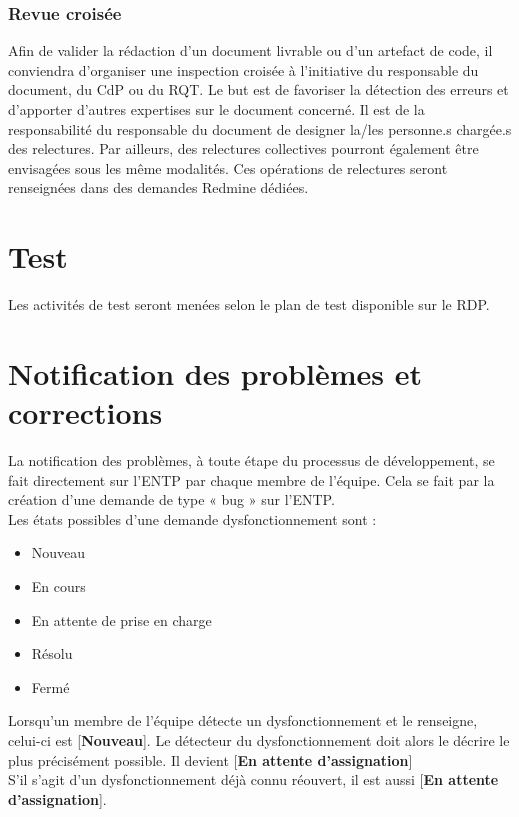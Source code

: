 \documentclass[a4paper,11pt,titlepage]{article}
\begin{document}
\subsubsection{Revue croisée} \label{sec:Rev}
Afin de valider la rédaction d'un document livrable ou d'un artefact de
code, il conviendra d'organiser une inspection croisée à l'initiative du
responsable du document, du CdP ou du RQT. Le but est de favoriser la
détection des erreurs et d'apporter d'autres expertises sur le document
concerné. Il est de la responsabilité du responsable du document de designer la/les personne.s
chargée.s des relectures. Par ailleurs, des relectures collectives pourront également être
envisagées sous les même modalités. Ces opérations de relectures seront
renseignées dans des demandes Redmine dédiées.

\section{Test}
Les activités de test seront menées selon le plan de test \cite[\refPlanTest]{PDT} 
disponible sur le RDP.

\section{Notification des problèmes et corrections} \label{sec:NotifProb}
La notification des problèmes, à toute étape du processus de
développement, se fait directement sur l'ENTP par chaque membre de l'équipe.
Cela se fait par la création d'une demande de type « bug » sur l'ENTP.\\
Les états possibles d'une demande dysfonctionnement sont :
\begin{itemize}
    \item Nouveau
    \item En cours
    \item En attente de prise en charge
    \item Résolu
    \item Fermé
\end{itemize}

Lorsqu'un membre de l'équipe détecte un dysfonctionnement et le renseigne, celui-ci est [\textbf{Nouveau}]. Le détecteur du dysfonctionnement doit alors le décrire le plus précisément possible. Il devient [\textbf{En attente d'assignation}] \\

S'il s'agit d'un dysfonctionnement déjà connu réouvert, il est aussi [\textbf{En attente d'assignation}].
\end{document}
